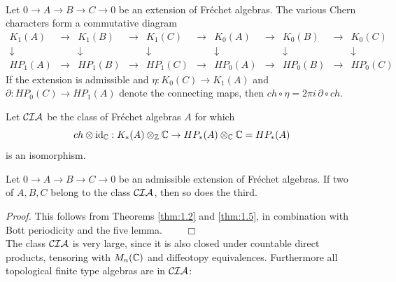 \begin{thm}\label{thm:1.5} \textup{\cite[Theorem 16]{Nis}}\\
Let $0 \to A \to B \to C \to 0$ be an extension of Fr\'echet
algebras. The various Chern characters form a commutative
diagram
\[
\begin{array}{ccccccccccc}
K_1(A) & \to & K_1(B) & \to & K_1(C) & \to & K_0(A) & \to &
 K_0(B) & \to & K_0(C) \\
\downarrow & & \downarrow & & \downarrow & & \downarrow & &
\downarrow & & \downarrow \\
HP_1(A) & \to & HP_1(B) & \to & HP_1(C) & \to & HP_0(A) & \to &
 HP_0(B) & \to & HP_0(C)
\end{array}
\]
If the extension is admissible and $\eta : K_0 (C) \to K_1 (A)$
and $\partial : HP_0 (C) \to HP_1 (A)$ denote the connecting
maps, then $ch \circ \eta = 2\pi i \, \partial \circ ch$.
\end{thm}
\vspace{2mm}

Let $\mathcal{CIA}$ be the class of Fr\'echet algebras $A$ for which
\begin{equation}
ch \otimes \mathrm{id}_{\mathbb C} : K_* (A) \otimes_{\mathbb Z} \mathbb C \to HP_*
(A) \otimes_{\mathbb C} \mathbb C = HP_* (A)
\end{equation}
is an isomorphism.

\begin{cor}\label{cor:1.10}
Let $0 \to A \to B \to C \to 0$ be an admissible extension of
Fr\'echet algebras. If two of ${A,B,C}$ belong to the class
$\mathcal{CIA}$, then so does the third.
\end{cor}
\emph{Proof.}
This follows from Theorems \ref{thm:1.2} and \ref{thm:1.5},
in combination with Bott periodicity and the five lemma.
$\qquad \Box$ \\[3mm]

The class $\mathcal{CIA}$ is very large, since it is also closed
under countable direct products, tensoring with $M_n (\mathbb C)$
and diffeotopy equivalences. Furthermore all topological
finite type algebras are in $\mathcal{CIA}$:

